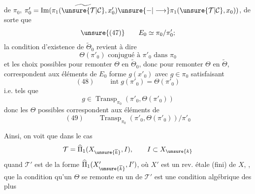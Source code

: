 de $\pi_0$, $\pi'_0=\operatorname{Im}(\pi_1(\widetilde{\unsure{\mathcal{T}|\mathcal{C}}},x'_0)\unsure{-|\longrightarrow}\pi_1(\unsure{\mathcal{T}|\mathcal{C}},x_0))$, de sorte que
\[
\unsure{(47)}\qquad E_0\simeq\pi_0/\pi'_0;
\]
la condition d'existence de $\widetilde{\Theta}_0$ revient à dire
\[
\Theta(\pi'_0)\text{ conjugué à }\pi'_0\text{ dans }\pi_0
\]
et les choix possibles pour remonter $\Theta$ en $\widetilde{\Theta}_0$, donc pour remonter $\Theta$ en $\widetilde{\Theta}$, correspondent aux éléments  de $E_0$   forme $g(x'_0)$ avec $g\in\pi_0$ satisfaisant
\[
(48)\qquad \operatorname{int}g(\pi'_0)=\Theta(\pi'_0)
\]
i.e. tels que
\[
g\in\operatorname{Transp}_{\pi_0}(\pi'_0,\Theta(\pi'_0))
\]
donc les $\Theta$ possibles correspondent aux éléments de
\[
(49)\qquad \operatorname{Transp}_{\pi_0}(\pi'_0,\Theta(\pi'_0))/\pi'_0
\]

Ainsi, on voit que dans le cas 
\[
\mathcal{T}=\widehat{\Pi}_1(X_{\unsure{\overline{k}}},I),\qquad I\subset X_{\unsure{k}}
\]
quand $\mathcal{T}'$  est de la forme $\widehat{\Pi}_1(X'_{\unsure{\overline{k}}},I')$, où $X'$ est un rev. étale (fini) de $X$, , que la condition qu'un $\Theta$  se remonte en un  de $\mathcal{T}'$ est une condition algébrique des plus

